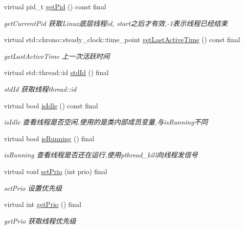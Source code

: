 \begin{DoxyCompactItemize}
virtual pid\+\_\+t \hyperlink{classThread_ad7fd4dfa0edff93d118b2edf5ab7be2c}{get\+Pid} () const final
\begin{DoxyCompactList}\small\item\em get\+Current\+Pid 获取\+Linux底层线程id, start之后才有效,-\/1表示线程已经结束 \end{DoxyCompactList}\item 
virtual std\+::chrono\+::steady\+\_\+clock\+::time\+\_\+point \hyperlink{classThread_a23de6830557bdbe18a0baf17db58aec6}{get\+Last\+Active\+Time} () const final
\begin{DoxyCompactList}\small\item\em get\+Last\+Active\+Time 上一次活跃时间 \end{DoxyCompactList}\item 
virtual std\+::thread\+::id \hyperlink{classThread_a231da16ab1825ee982c4aa43f78c1b22}{std\+Id} () final
\begin{DoxyCompactList}\small\item\em std\+Id 获取线程thread\+::id \end{DoxyCompactList}\item 
virtual bool \hyperlink{classThread_acb6c590deecea4778a855459f080060a}{is\+Idle} () const final
\begin{DoxyCompactList}\small\item\em is\+Idle 查看线程是否空闲,使用的是类内部成员变量,与is\+Running不同 \end{DoxyCompactList}\item 
virtual bool \hyperlink{classThread_ab4c718f3ca4aa7514c7e89e38f9da894}{is\+Running} () final
\begin{DoxyCompactList}\small\item\em is\+Running 查看线程是否还在运行,使用pthread\+\_\+kill向线程发信号 \end{DoxyCompactList}\item 
virtual void \hyperlink{classThread_a96661f80f5fbd26042a24eafd675cd91}{set\+Prio} (int prio) final
\begin{DoxyCompactList}\small\item\em set\+Prio 设置优先级 \end{DoxyCompactList}\item 
virtual int \hyperlink{classThread_a712ab58b9e89f458427b213b1197a666}{get\+Prio} () final
\begin{DoxyCompactList}\small\item\em get\+Prio 获取线程优先级 \end{DoxyCompactList}\item 

\end{DoxyCompactItemize}
